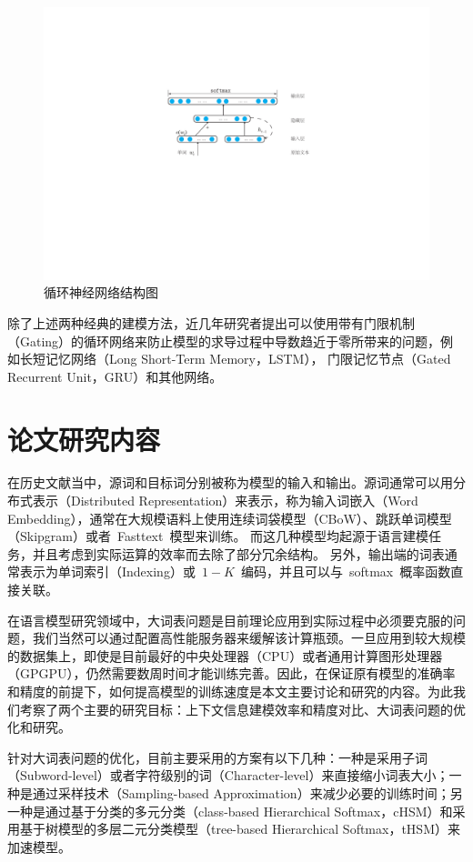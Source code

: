 \begin{figure}
  \centering
  \includegraphics[width=.8\linewidth]{./figures/rnnlm.pdf}
  \caption{循环神经网络结构图}\label{fig:rnnlm}
\end{figure}

除了上述两种经典的建模方法，近几年研究者提出可以使用带有门限机制（Gating）的循环网络来防止模型的求导过程中导数趋近于零所带来的问题，例如长短记忆网络（Long Short-Term Memory，LSTM）， 门限记忆节点（Gated Recurrent Unit，GRU）和其他网络。


\section{论文研究内容}
在历史文献当中，源词和目标词分别被称为模型的输入和输出。源词通常可以用分布式表示（Distributed Representation）来表示，称为输入词嵌入（Word Embedding），通常在大规模语料上使用连续词袋模型（CBoW）、跳跃单词模型（Skipgram）或者~Fasttext~模型来训练。
而这几种模型均起源于语言建模任务，并且考虑到实际运算的效率而去除了部分冗余结构。
另外，输出端的词表通常表示为单词索引（Indexing）或~$1-K$~编码，并且可以与~softmax~概率函数直接关联。

在语言模型研究领域中，大词表问题是目前理论应用到实际过程中必须要克服的问题，我们当然可以通过配置高性能服务器来缓解该计算瓶颈。一旦应用到较大规模的数据集上，即使是目前最好的中央处理器（CPU）或者通用计算图形处理器（GPGPU），仍然需要数周时间才能训练完善。因此，在保证原有模型的准确率和精度的前提下，如何提高模型的训练速度是本文主要讨论和研究的内容。为此我们考察了两个主要的研究目标：上下文信息建模效率和精度对比、大词表问题的优化和研究。

针对大词表问题的优化，目前主要采用的方案有以下几种：一种是采用子词（Subword-level）或者字符级别的词（Character-level）来直接缩小词表大小；一种是通过采样技术（Sampling-based Approximation）来减少必要的训练时间；另一种是通过基于分类的多元分类（class-based Hierarchical Softmax，cHSM）和采用基于树模型的多层二元分类模型（tree-based Hierarchical Softmax，tHSM）来加速模型。

